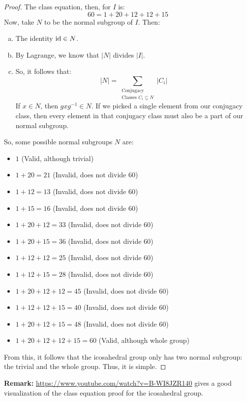 \documentclass[letterpaper]{article}
\begin{document}
\begin{mdframed}
\begin{proof}
        The class equation, then, for $I$ is: 
        \[60 = 1 + 20 + 12 + 12 + 15\]
        Now, take $N$ to be the normal subgroup of $I$. Then: 
        \begin{enumerate}[(a)]
            \item The identity $\operatorname{id} \in N$. 
            \item By Lagrange, we know that $|N|$ divides $|I|$.
            \item So, it follows that: 
            \[|N| = \sum_{\substack{\text{Conjugacy} \\ \text{Classes $C_i \subseteq N$}}} |C_i|\]
            If $x \in N$, then $gxg^{-1} \in N$. If we picked a single element from our conjugacy class, then every element in that conjugacy class must also be a part of our normal subgroup.
        \end{enumerate}
        So, some possible normal subgroups $N$ are: 
        \begin{itemize}
            \item $1$ (Valid, although trivial)
            \item $1 + 20 = 21$ (Invalid, does not divide 60)
            \item $1 + 12 = 13$ (Invalid, does not divide 60)
            \item $1 + 15 = 16$ (Invalid, does not divide 60)
            \item $1 + 20 + 12 = 33$ (Invalid, does not divide 60)
            \item $1 + 20 + 15 = 36$ (Invalid, does not divide 60)
            \item $1 + 12 + 12 = 25$ (Invalid, does not divide 60)
            \item $1 + 12 + 15 = 28$ (Invalid, does not divide 60)
            \item $1 + 20 + 12 + 12 = 45$ (Invalid, does not divide 60)
            \item $1 + 12 + 12 + 15 = 40$ (Invalid, does not divide 60)
            \item $1 + 20 + 12 + 15 = 48$ (Invalid, does not divide 60)
            \item $1 + 20 + 12 + 12 + 15 = 60$ (Valid, although whole group)
        \end{itemize}
        From this, it follows that the icosahedral group only has two normal subgroup: the trivial and the whole group. Thus, it is simple. 
    \end{proof}
\end{mdframed}
\textbf{Remark:} \url{https://www.youtube.com/watch?v=B-WI8JZR140} gives a good visualization of the class equation proof for the icosahedral group. 
\end{document}
